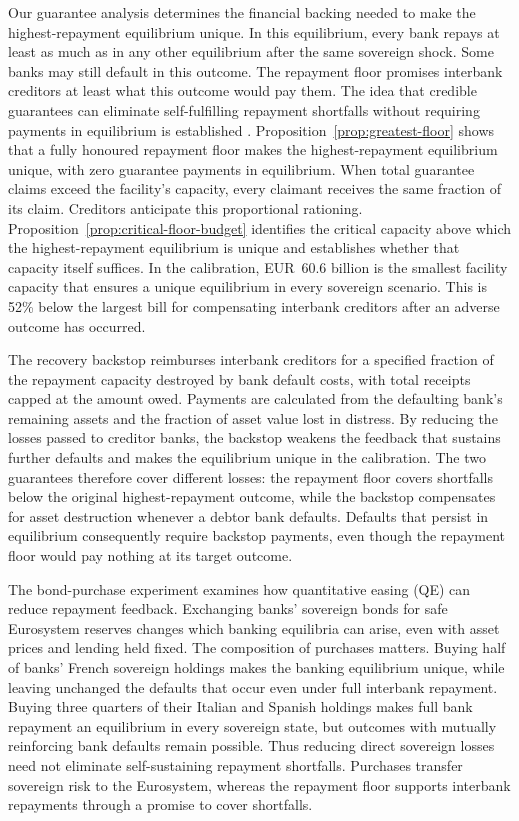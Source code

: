 \documentclass[preprint,12pt,authoryear]{elsarticle}
\begin{document}
Our guarantee analysis determines the financial backing needed to make the highest-repayment equilibrium unique. In this equilibrium, every bank repays at least as much as in any other equilibrium after the same sovereign shock. Some banks may still default in this outcome. The repayment floor promises interbank creditors at least what this outcome would pay them. The idea that credible guarantees can eliminate self-fulfilling repayment shortfalls without requiring payments in equilibrium is established \citep{DiamondDybvig1983,JacksonPernoud2021}. Proposition~\ref{prop:greatest-floor} shows that a fully honoured repayment floor makes the highest-repayment equilibrium unique, with zero guarantee payments in equilibrium. When total guarantee claims exceed the facility's capacity, every claimant receives the same fraction of its claim. Creditors anticipate this proportional rationing. Proposition~\ref{prop:critical-floor-budget} identifies the critical capacity above which the highest-repayment equilibrium is unique and establishes whether that capacity itself suffices. In the calibration, EUR~60.6 billion is the smallest facility capacity that ensures a unique equilibrium in every sovereign scenario. This is 52\% below the largest bill for compensating interbank creditors after an adverse outcome has occurred.

The recovery backstop reimburses interbank creditors for a specified fraction of the repayment capacity destroyed by bank default costs, with total receipts capped at the amount owed. Payments are calculated from the defaulting bank's remaining assets and the fraction of asset value lost in distress. By reducing the losses passed to creditor banks, the backstop weakens the feedback that sustains further defaults and makes the equilibrium unique in the calibration. The two guarantees therefore cover different losses: the repayment floor covers shortfalls below the original highest-repayment outcome, while the backstop compensates for asset destruction whenever a debtor bank defaults. Defaults that persist in equilibrium consequently require backstop payments, even though the repayment floor would pay nothing at its target outcome.

The bond-purchase experiment examines how quantitative easing (QE) can reduce repayment feedback. Exchanging banks' sovereign bonds for safe Eurosystem reserves changes which banking equilibria can arise, even with asset prices and lending held fixed. The composition of purchases matters. Buying half of banks' French sovereign holdings makes the banking equilibrium unique, while leaving unchanged the defaults that occur even under full interbank repayment. Buying three quarters of their Italian and Spanish holdings makes full bank repayment an equilibrium in every sovereign state, but outcomes with mutually reinforcing bank defaults remain possible. Thus reducing direct sovereign losses need not eliminate self-sustaining repayment shortfalls. Purchases transfer sovereign risk to the Eurosystem, whereas the repayment floor supports interbank repayments through a promise to cover shortfalls.
\end{document}
